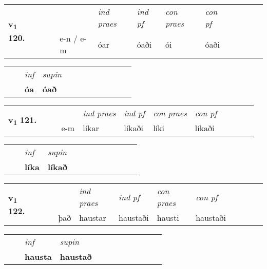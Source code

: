 \begin{tabular}{llllllllllll}\toprule
\multirow{4}{*}{{{\textbf{v{\textsubscript{1}}} \Large{\textbf{120.}}}}}  & &  & &  \textit{ind praes} & \textit{ind pf} & \textit{con praes} & \textit{con pf} \\*
&  & & e-n / e-m & óar & óaði & ói & óaði \\*
\cmidrule{5-9}
\end{tabular}


\begin{tabular}{llllllllllll}
 & & \textit{inf}      & \textit{supin}       \\*
  & & \textbf{óa}       &  \textbf{óað}   \\*
\cmidrule{1-12}
\end{tabular}





\begin{tabular}{llllllllllll}\toprule
\multirow{4}{*}{{{\textbf{v{\textsubscript{1}}} \Large{\textbf{121.}}}}}  & &  & &  \textit{ind praes} & \textit{ind pf} & \textit{con praes} & \textit{con pf} \\*
&  & & e-m & líkar & líkaði & líki & líkaði \\*
\cmidrule{5-9}
\end{tabular}


\begin{tabular}{llllllllllll}
 & & \textit{inf}      & \textit{supin}       \\*
  & & \textbf{líka}       &  \textbf{líkað}   \\*
\cmidrule{1-12}
\end{tabular}





\begin{tabular}{llllllllllll}\toprule
\multirow{4}{*}{{{\textbf{v{\textsubscript{1}}} \Large{\textbf{122.}}}}}  & &  & &  \textit{ind praes} & \textit{ind pf} & \textit{con praes} & \textit{con pf} \\*
&  & & það & haustar & haustaði & hausti & haustaði \\*
\cmidrule{5-9}
\end{tabular}


\begin{tabular}{llllllllllll}
 & & \textit{inf}      & \textit{supin}       \\*
  & & \textbf{hausta}       &  \textbf{haustað}   \\*
\cmidrule{1-12}
\end{tabular}





